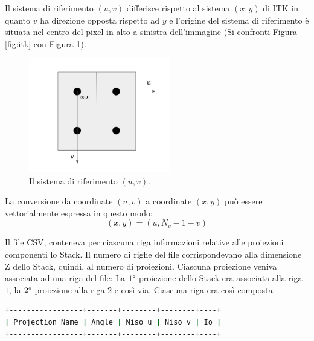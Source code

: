 \documentclass[a4paper,12pt, doubleside]{report}
\begin{document}
                    Il sistema di riferimento $(u,v)$ differisce rispetto al sistema $(x,y)$ di ITK in quanto $v$ ha direzione opposta rispetto ad $y$ e l'origine del sistema di riferimento è situata nel centro del pixel in alto a sinistra dell'immagine (Si confronti Figura \ref{fig:itk} con Figura \ref{fig:uv}).
                    
                    \begin{figure}[h]
                        \centering
                        \includegraphics[width=0.55\textwidth]{uv}
                        \caption{Il sistema di riferimento $(u,v)$.}
                        \label{fig:uv}
                    \end{figure}
                
                    La conversione da coordinate $(u,v)$ a coordinate $(x,y)$ può essere vettorialmente espressa in questo modo:
                    \begin{equation} \label{eq:uv-conversion}
                        (x,y) = ( u, N_v - 1 - v )
                    \end{equation}
                    
                \bigskip    
                \par
                    Il file CSV, conteneva per ciascuna riga informazioni relative alle proiezioni componenti lo Stack. Il numero di righe del file corrispondevano alla dimensione Z dello Stack, quindi, al numero di proiezioni. Ciascuna proiezione veniva associata ad una riga del file: La $1\degree$ proiezione dello Stack era associata alla riga $1$, la $2\degree$ proiezione alla riga $2$ e così via. Ciascuna riga era così composta: 
                    
                    \begin{lstlisting}[language=bash, frame=bt] 
+-----------------+-------+--------+--------+----+
| Projection Name | Angle | Niso_u | Niso_v | Io |
+-----------------+-------+--------+--------+----+
                    \end{lstlisting}
                    
\end{document}
